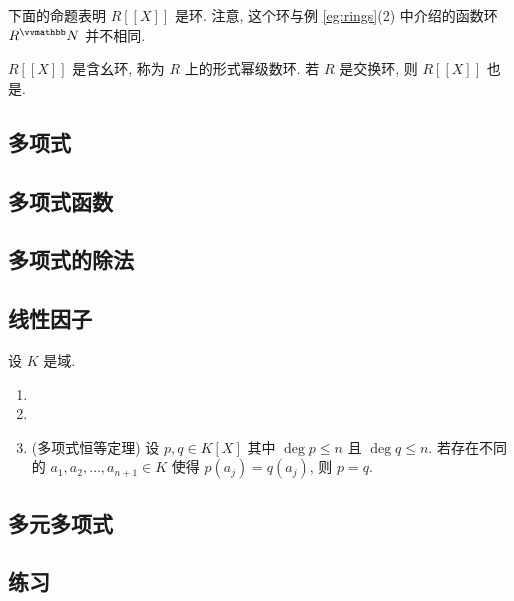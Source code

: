 下面的命题表明 \(R[\![X]\!]\) 是环. 注意, 这个环与例 \ref{eg:rings}(2) 中介绍的函数环 \(R^\N\) 并不相同.

\begin{proposition}
    \(R[\![X]\!]\) 是含幺环, 称为 \(R\) 上的形式幂级数环. 若 \(R\) 是交换环, 则 \(R[\![X]\!]\) 也是.
\end{proposition}

\subsection{多项式}

\subsection{多项式函数}

\begin{remark}\label{rem:polynomial-functions}
    
\end{remark}

\subsection{多项式的除法}

\subsection{线性因子}

\begin{remark}\label{rem:linear-factors}
    设 \(K\) 是域.
    \begin{enumerate}
        \item
        \item
        \item (多项式恒等定理) 设 \(p, q \in K[X]\) 其中 \(\deg p \leq n\) 且 \(\deg q \leq n\). 若存在不同的 \(a_1, a_2, \ldots, a_{n + 1} \in K\) 使得 \(p(a_j) = q(a_j)\), 则 \(p = q\).
    \end{enumerate}
\end{remark}

\subsection{多元多项式}

\subsection{练习}

